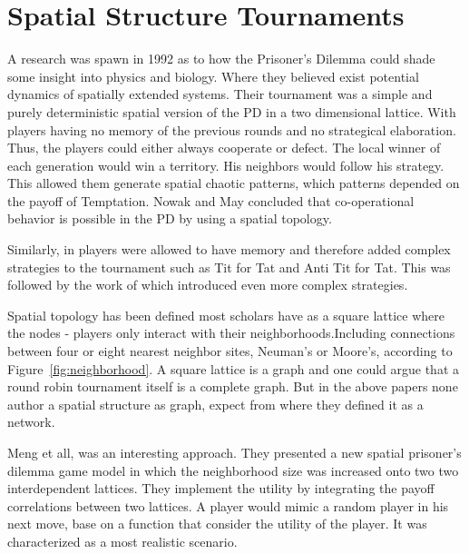 \section{Spatial Structure Tournaments}

A research was spawn in 1992 as to how the Prisoner's Dilemma could shade some
insight into physics and biology. Where they believed exist potential dynamics
of spatially extended systems. Their tournament was a simple and purely
deterministic spatial version of the PD in a two dimensional lattice. With
players having no memory of the previous rounds and no strategical elaboration.
Thus, the players could either always cooperate or defect. The local winner of
each generation would win a territory. His neighbors would follow his strategy.
This  allowed them generate spatial chaotic patterns, which patterns depended
on the payoff of Temptation. Nowak and May concluded that co-operational
behavior is possible in the PD by using a spatial topology.

Similarly, in \parencite{Lindgren1994} players were allowed to have
memory and therefore added complex strategies to the tournament such as Tit for
Tat and  Anti Tit for Tat. This was followed  by the work of
\parencite{Brauchli1999} which introduced even more
complex strategies.

Spatial topology has been defined most scholars have as a square lattice where
the nodes - players only interact with their neighborhoods.Including connections
between four or eight nearest neighbor sites, Neuman's or Moore's, according to
Figure~\ref{fig:neighborhood}. A square lattice  is a graph and one could argue
that a round robin tournament itself is a complete graph. But in the above papers
none author a spatial structure as graph, expect from \parencite{Meng2015} where
they defined it as a network.

Meng et all, was an interesting approach. They presented a new spatial prisoner's
dilemma game model in which the neighborhood size was increased onto two
two interdependent lattices. They implement the utility by integrating the payoff
correlations between two lattices. A player would mimic a random player in his next
move, base on a function that consider the utility of the player. It was characterized
as a most realistic scenario.

